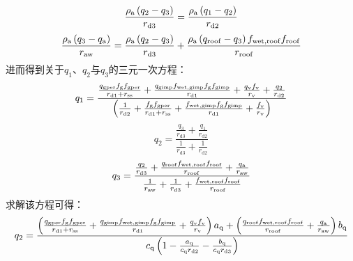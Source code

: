 %
\begin{equation}
  \frac{\rho _{\rm a} \left( q_{2} - q_{3}\right)}{r_{\mathrm{d3}}} = \frac{\rho _{\rm a} \left( q_{1} - q_{2}\right)}{r_{\mathrm{d2}}}
\end{equation}
%
\begin{equation}
  \frac{\rho _{\rm a} \left( q_{3} - q_{\rm a}\right)}{r_{\mathrm{aw}}} = \frac{\rho _{\rm a} \left( q_{2} - q_{3}\right)}{r_{\mathrm{d3}}} + \frac{\rho _{\rm a} \left( q_{\mathrm{roof}}-q_{3}\right) f_{\mathrm{wet,roof}} f_{\mathrm{roof}}}{r_{\mathrm{roof}}}
\end{equation}
进而得到关于$q_{1}$、$q_{2}$与$q_{3}$的三元一次方程：
\begin{equation}
  \label{3lay_q1}
  q_{1} = \frac{\frac{q_{\mathrm{gper}} f_{\mathrm{g}} f_{\mathrm{gper}}}{r_{\mathrm{d1}} + r_{\mathrm{ss}}} + \frac{q_{\mathrm{gimp}} f_{\mathrm{wet,gimp}} f_{\mathrm{g}} f_{\mathrm{gimp}}}{r_{\mathrm{d1}}} + \frac{q_{\mathrm{v}} f_{\rm v}}{r_{\mathrm{v}}} + \frac{q_{\mathrm{2}}}{r_{\mathrm{d2}}}}{\left(\frac{1}{r_{\mathrm{d2}}} + \frac{f_{\mathrm{g}} f_{\mathrm{gper}}}{r_{\mathrm{d1}} + r_{\mathrm{ss}}} + \frac{f_{\mathrm{wet,gimp}} f_{\mathrm{g}} f_{\mathrm{gimp}}}{r_{\mathrm{d1}}}+\frac{f_{\rm v}}{r_{\mathrm{v}}}\right)}
\end{equation}
%
\begin{equation}
  q_{2} = \frac{\frac{q_{\mathrm{3}}}{r_{\mathrm{d3}}} + \frac{q_{\mathrm{1}}}{r_{\mathrm{d2}}}}{\frac{1}{r_{\mathrm{d3}}} + \frac{1}{r_{\mathrm{d2}}}}
\end{equation}
%
\begin{equation}
  \label{3lay_q3}
  q_{3} = \frac{ \frac{q_{2}}{r_{\mathrm{d3}}} + \frac{q_{\mathrm{roof}} f_{\mathrm{wet,roof}} f_{\mathrm{roof}}}{r_{\mathrm{roof}}} + \frac{q_{\rm a}}{r_{\mathrm{aw}}} }{ \frac{1}{r_{\mathrm{aw}}} + \frac{1}{r_{\mathrm{d3}}} + \frac{f_{\mathrm{wet,roof}} f_{\mathrm{roof}}}{r_{\mathrm{roof}}} }
\end{equation}
求解该方程可得：
\begin{equation}
  q_{2} = \\
  \frac{\left(\frac{q_{\mathrm{gper}} f_{\mathrm{g}} f_{\mathrm{gper}}}{r_{\mathrm{d1}}+r_{\mathrm{ss}}} + \frac{q_{\mathrm{gimp}} f_{\mathrm{wet,gimp}} f_{\mathrm{g}} f_{\mathrm{gimp}}}{r_{\mathrm{d1}}} + \frac{q_{\mathrm{v}} f_{\rm v}}{r_{\mathrm{v}}}\right)a_{\mathrm{q}} + \left(\frac{q_{\mathrm{roof}} f_{\mathrm{wet,roof}} f_{\mathrm{roof}}}{r_{\mathrm{roof}}} + \frac{q_{\rm a}}{r_{\mathrm{aw}}}\right)b_{\mathrm{q}} }{c_{\mathrm{q}} \left( 1 - \frac{a_{\mathrm{q}}}{c_{\mathrm{q}} r_{\mathrm{d2}}} - \frac{b_{\mathrm{q}}}{c_{\mathrm{q}} r_{\mathrm{d3}}} \right)}
\end{equation}
